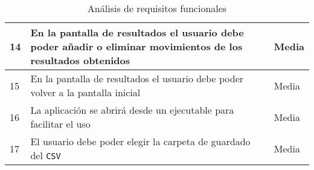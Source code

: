 \begin{table}[H]
\begin{center}
\begin{tabular}{p{} | p{} p{}}
            \hline
            14& En la pantalla de resultados el usuario debe poder añadir o eliminar movimientos de los resultados obtenidos & Media\\
            \hline
            15& En la pantalla de resultados el usuario debe poder volver a la pantalla inicial & Media\\
            \hline
            16& La aplicación se abrirá desde un ejecutable para facilitar el uso& Media\\
            \hline
            17& El usuario debe poder elegir la carpeta de guardado del \texttt{CSV}& Media\\
            \hline
        \end{tabular} 
    \end{center}
    \caption{Análisis de requisitos funcionales}
    \label{ReqFuncionales}
\end{table}


